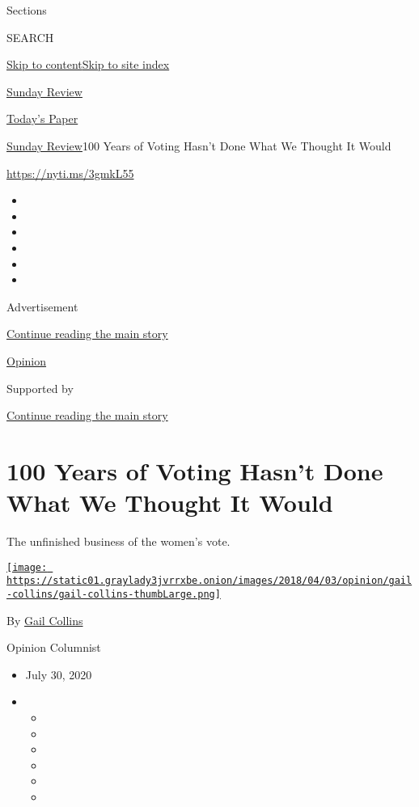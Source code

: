Sections

SEARCH

\protect\hyperlink{site-content}{Skip to
content}\protect\hyperlink{site-index}{Skip to site index}

\href{https://www.nytimes3xbfgragh.onion/section/opinion/sunday}{Sunday
Review}

\href{https://myaccount.nytimes3xbfgragh.onion/auth/login?response_type=cookie\&client_id=vi}{}

\href{https://www.nytimes3xbfgragh.onion/section/todayspaper}{Today's
Paper}

\href{/section/opinion/sunday}{Sunday Review}\textbar{}100 Years of
Voting Hasn't Done What We Thought It Would

\url{https://nyti.ms/3gmkL55}

\begin{itemize}
\item
\item
\item
\item
\item
\item
\end{itemize}

Advertisement

\protect\hyperlink{after-top}{Continue reading the main story}

\href{/section/opinion}{Opinion}

Supported by

\protect\hyperlink{after-sponsor}{Continue reading the main story}

\hypertarget{100-years-of-voting-hasnt-done-what-we-thought-it-would}{%
\section{100 Years of Voting Hasn't Done What We Thought It
Would}\label{100-years-of-voting-hasnt-done-what-we-thought-it-would}}

The unfinished business of the women's vote.

\href{https://www.nytimes3xbfgragh.onion/by/gail-collins}{\texttt{[image: https://static01.graylady3jvrrxbe.onion/images/2018/04/03/opinion/gail-collins/gail-collins-thumbLarge.png]}}

By \href{https://www.nytimes3xbfgragh.onion/by/gail-collins}{Gail
Collins}

Opinion Columnist

\begin{itemize}
\item
  July 30, 2020
\item
  \begin{itemize}
  \item
  \item
  \item
  \item
  \item
  \item
  \end{itemize}
\end{itemize}

